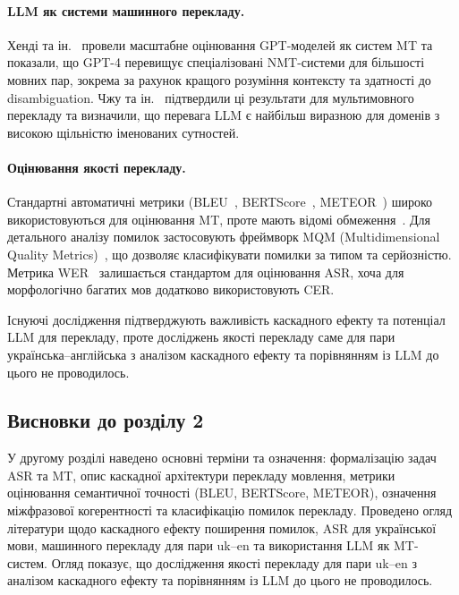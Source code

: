 \paragraph{LLM як системи машинного перекладу.}
Хенді та ін.~\cite{hendy_llm_mt} провели масштабне оцінювання GPT-моделей
як систем MT та показали, що GPT-4 перевищує спеціалізовані NMT-системи
для більшості мовних пар, зокрема за рахунок кращого розуміння контексту
та здатності до disambiguation. Чжу та ін.~\cite{llm_mt} підтвердили
ці результати для мультимовного перекладу та визначили, що перевага LLM
є найбільш виразною для доменів з високою щільністю іменованих сутностей.

\paragraph{Оцінювання якості перекладу.}
Стандартні автоматичні метрики (BLEU~\cite{papineni_bleu},
BERTScore~\cite{bert_score}, METEOR~\cite{banerjee_meteor}) широко
використовуються для оцінювання MT, проте мають відомі
обмеження~\cite{post_bleu}. Для детального аналізу помилок застосовують
фреймворк MQM (Multidimensional Quality Metrics)~\cite{mqm}, що
дозволяє класифікувати помилки за типом та серйозністю. Метрика
WER~\cite{wer_metric} залишається стандартом для оцінювання ASR,
хоча для морфологічно багатих мов додатково використовують CER.

Існуючі дослідження підтверджують важливість каскадного
ефекту та потенціал LLM для перекладу, проте досліджень
якості перекладу саме для пари українська--англійська з аналізом
каскадного ефекту та порівнянням із LLM до цього не проводилось.

\subsection{Висновки до розділу 2}

У другому розділі наведено основні терміни та означення: формалізацію
задач ASR та MT, опис каскадної архітектури перекладу мовлення, метрики
оцінювання семантичної точності (BLEU, BERTScore, METEOR), означення
міжфразової когерентності та класифікацію помилок перекладу. Проведено
огляд літератури щодо каскадного ефекту поширення помилок, ASR для
української мови, машинного перекладу для пари uk--en та використання
LLM як MT-систем. Огляд показує, що дослідження якості
перекладу для пари uk--en з аналізом каскадного ефекту та порівнянням
із LLM до цього не проводилось.

\clearpage
